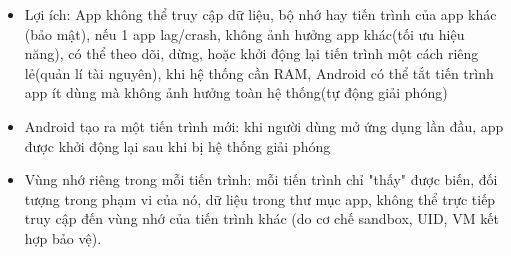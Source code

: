    \begin{flushleft}
      \setlength{\leftmargini}{1.5cm}
      \begin{itemize}
        \item Lợi ích: App không thể truy cập dữ liệu, bộ nhớ hay tiến trình của app khác (bảo mật), nếu 1 app lag/crash, không ảnh hưởng app khác(tối ưu hiệu năng), có thể theo dõi, dừng, hoặc khởi động lại tiến trình một cách riêng lẻ(quản lí tài nguyên), khi hệ thống cần RAM, Android có thể tắt tiến trình app ít dùng mà không ảnh hưởng toàn hệ thống(tự động giải phóng)
        \item Android tạo ra một tiến trình mới: khi người dùng mở ứng dụng lần đầu, app được khởi động lại sau khi bị hệ thống giải phóng
        \item Vùng nhớ riêng trong mỗi tiến trình: mỗi tiến trình chỉ "thấy" được biến, đối tượng trong phạm vi của nó, dữ liệu trong thư mục app, không thể trực tiếp truy cập đến vùng nhớ của tiến trình khác (do cơ chế sandbox, UID, VM kết hợp bảo vệ).
      \end{itemize}
    \end{flushleft}
